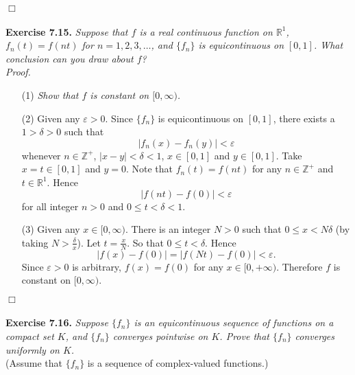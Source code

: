 \documentclass{article}
\begin{document}
$\Box$ \\\\






\textbf{Exercise 7.15.}
\emph{Suppose that $f$ is a real continuous function on $\mathbb{R}^1$,
$f_n(t)= f(nt)$ for $n=1,2,3,\ldots$,
and $\{f_n\}$ is equicontinuous on $[0,1]$.
What conclusion can you draw about $f$?} \\

\emph{Proof.}
\begin{enumerate}
\item[(1)]
  \emph{Show that $f$ is constant on $[0,\infty)$.}

\item[(2)]
  Given any $\varepsilon > 0$.
  Since $\{f_n\}$ is equicontinuous on $[0,1]$,
  there exists a $1 > \delta > 0$ such that
  \[
    |f_n(x)-f_n(y)| < \varepsilon
  \]
  whenever $n \in \mathbb{Z}^{+}$, $|x-y| < \delta < 1$, $x \in [0,1]$ and $y \in [0,1]$.
  Take $x = t \in [0,1]$ and $y = 0$.
  Note that $f_n(t) = f(nt)$ for any $n \in \mathbb{Z}^{+}$ and
  $t \in \mathbb{R}^1$.
  Hence
  \[
    |f(nt) - f(0)| < \varepsilon
  \]
  for all integer $n > 0$ and $0 \leq t < \delta < 1$.

\item[(3)]
  Given any $x \in [0,\infty)$.
  There is an integer $N > 0$ such that $0 \leq x < N\delta$
  (by taking $N > \frac{\delta}{x}$).
  Let $t = \frac{x}{N}$.
  So that $0 \leq t < \delta$.
  Hence
  \[
    |f(x) - f(0)| = |f(Nt) - f(0)| < \varepsilon.
  \]
  Since $\varepsilon > 0$ is arbitrary,
  $f(x) = f(0)$ for any $x \in [0,+\infty)$.
  Therefore $f$ is constant on $[0,\infty)$.
\end{enumerate}
$\Box$ \\\\






\textbf{Exercise 7.16.}
\emph{Suppose $\{f_n\}$ is an equicontinuous sequence of functions on a compact set $K$,
and $\{f_n\}$ converges pointwise on $K$.
Prove that $\{f_n\}$ converges uniformly on $K$.} \\

(Assume that $\{f_n\}$ is a sequence of complex-valued functions.) \\
\end{document}
